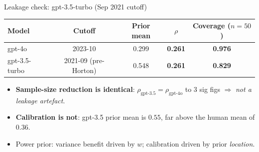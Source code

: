 \documentclass[10pt, aspectratio=169]{beamer}
\begin{document}
\begin{frame}{Leakage check: gpt-3.5-turbo (Sep 2021 cutoff)}
\centering
\small
\begin{tabular}{lcccc}
\toprule
Model & Cutoff & Prior mean & $\rho$ & Coverage ($n=50$) \\
\midrule
gpt-4o        & 2023-10 & 0.299 & \textbf{0.261} & \textbf{0.976} \\
gpt-3.5-turbo & 2021-09 (pre-Horton) & 0.548 & \textbf{0.261} & \textbf{0.829} \\
\bottomrule
\end{tabular}

\vspace{1em}
\begin{itemize}\setlength{\itemsep}{4pt}
  \item \textbf{Sample-size reduction is identical}: $\rho_{\text{gpt-3.5}} = \rho_{\text{gpt-4o}}$ to 3 sig figs $\Rightarrow$ \emph{not a leakage artefact}.
  \item \textbf{Calibration is not}: gpt-3.5 prior mean is $0.55$, far above the human mean of $0.36$.
  \item Power prior: variance benefit driven by $w$; calibration driven by prior \emph{location}.
\end{itemize}
\end{frame}
\end{document}
